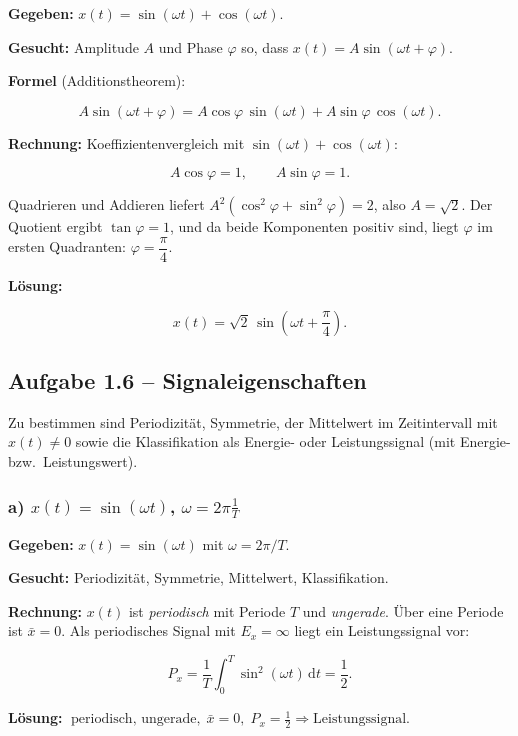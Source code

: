 \begin{beispiel}

\textbf{Gegeben:} $x(t) = \sin(\omega t) + \cos(\omega t)$.

\textbf{Gesucht:} Amplitude $A$ und Phase $\varphi$ so, dass
$x(t) = A\sin(\omega t + \varphi)$.

\textbf{Formel} (Additionstheorem):

$$
A\sin(\omega t + \varphi) = A\cos\varphi\,\sin(\omega t)
+ A\sin\varphi\,\cos(\omega t).
$$

\textbf{Rechnung:} Koeffizientenvergleich mit
$\sin(\omega t) + \cos(\omega t)$:

$$
A\cos\varphi = 1, \qquad A\sin\varphi = 1.
$$

Quadrieren und Addieren liefert $A^2(\cos^2\varphi + \sin^2\varphi) = 2$, also
$A = \sqrt{2}$. Der Quotient ergibt $\tan\varphi = 1$, und da beide
Komponenten positiv sind, liegt $\varphi$ im ersten Quadranten:
$\varphi = \dfrac{\pi}{4}$.

\textbf{Lösung:}

$$
\boxed{\;x(t) = \sqrt{2}\,\sin\!\left(\omega t + \frac{\pi}{4}\right).\;}
$$

\end{beispiel}

\subsection*{Aufgabe 1.6 – Signaleigenschaften}

Zu bestimmen sind Periodizität, Symmetrie, der Mittelwert im Zeitintervall mit
$x(t) \neq 0$ sowie die Klassifikation als Energie- oder Leistungssignal (mit
Energie- bzw.\ Leistungswert).

\subsubsection*{a) $x(t) = \sin(\omega t)$, $\omega = 2\pi\frac{1}{T}$}

\begin{beispiel}

\textbf{Gegeben:} $x(t) = \sin(\omega t)$ mit $\omega = 2\pi/T$.

\textbf{Gesucht:} Periodizität, Symmetrie, Mittelwert, Klassifikation.

\textbf{Rechnung:} $x(t)$ ist \emph{periodisch} mit Periode $T$ und
\emph{ungerade}. Über eine Periode ist $\bar{x} = 0$. Als periodisches Signal
mit $E_x = \infty$ liegt ein Leistungssignal vor:

$$
P_x = \frac{1}{T}\int_0^T \sin^2(\omega t)\,\mathrm{d}t = \frac{1}{2}.
$$

\textbf{Lösung:}
$\boxed{\;\text{periodisch, ungerade},\; \bar{x} = 0,\;
P_x = \tfrac12 \Rightarrow \text{Leistungssignal.}\;}$

\end{beispiel}

